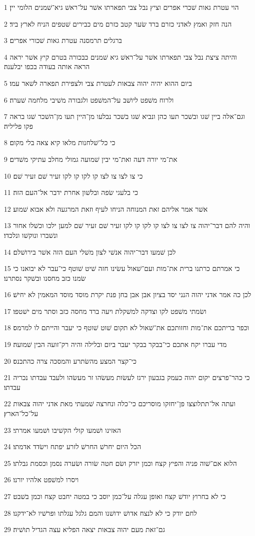 \par 1 הוי עטרת גאות שׁכרי אפרים וציץ נבל צבי תפארתו אשׁר על־ראשׁ גיא־שׁמנים הלומי יין׃
\par 2 הנה חזק ואמץ לאדני כזרם ברד שׂער קטב כזרם מים כבירים שׁטפים הניח לארץ ביד׃
\par 3 ברגלים תרמסנה עטרת גאות שׁכורי אפרים׃
\par 4 והיתה ציצת נבל צבי תפארתו אשׁר על־ראשׁ גיא שׁמנים כבכורה בטרם קיץ אשׁר יראה הראה אותה בעודה בכפו יבלענה׃
\par 5 ביום ההוא יהיה יהוה צבאות לעטרת צבי ולצפירת תפארה לשׁאר עמו׃
\par 6 ולרוח משׁפט ליושׁב על־המשׁפט ולגבורה משׁיבי מלחמה שׁערה׃
\par 7 וגם־אלה ביין שׁגו ובשׁכר תעו כהן ונביא שׁגו בשׁכר נבלעו מן־היין תעו מן־השׁכר שׁגו בראה פקו פליליה׃
\par 8 כי כל־שׁלחנות מלאו קיא צאה בלי מקום׃
\par 9 את־מי יורה דעה ואת־מי יבין שׁמועה גמולי מחלב עתיקי משׁדים׃
\par 10 כי צו לצו צו לצו קו לקו קו לקו זעיר שׁם זעיר שׁם׃
\par 11 כי בלעגי שׂפה ובלשׁון אחרת ידבר אל־העם הזה׃
\par 12 אשׁר אמר אליהם זאת המנוחה הניחו לעיף וזאת המרגעה ולא אבוא שׁמוע׃
\par 13 והיה להם דבר־יהוה צו לצו צו לצו קו לקו קו לקו זעיר שׁם זעיר שׁם למען ילכו וכשׁלו אחור ונשׁברו ונוקשׁו ונלכדו׃
\par 14 לכן שׁמעו דבר־יהוה אנשׁי לצון משׁלי העם הזה אשׁר בירושׁלם׃
\par 15 כי אמרתם כרתנו ברית את־מות ועם־שׁאול עשׂינו חזה שׁיט שׁוטף כי־עבר לא יבואנו כי שׂמנו כזב מחסנו ובשׁקר נסתרנו׃
\par 16 לכן כה אמר אדני יהוה הנני יסד בציון אבן אבן בחן פנת יקרת מוסד מוסד המאמין לא יחישׁ׃
\par 17 ושׂמתי משׁפט לקו וצדקה למשׁקלת ויעה ברד מחסה כזב וסתר מים ישׁטפו׃
\par 18 וכפר בריתכם את־מות וחזותכם את־שׁאול לא תקום שׁוט שׁוטף כי יעבר והייתם לו למרמס׃
\par 19 מדי עברו יקח אתכם כי־בבקר בבקר יעבר ביום ובלילה והיה רק־זועה הבין שׁמועה׃
\par 20 כי־קצר המצע מהשׂתרע והמסכה צרה כהתכנס׃
\par 21 כי כהר־פרצים יקום יהוה כעמק בגבעון ירגז לעשׂות מעשׂהו זר מעשׂהו ולעבד עבדתו נכריה עבדתו׃
\par 22 ועתה אל־תתלוצצו פן־יחזקו מוסריכם כי־כלה ונחרצה שׁמעתי מאת אדני יהוה צבאות על־כל־הארץ׃
\par 23 האזינו ושׁמעו קולי הקשׁיבו ושׁמעו אמרתי׃
\par 24 הכל היום יחרשׁ החרשׁ לזרע יפתח וישׂדד אדמתו׃
\par 25 הלוא אם־שׁוה פניה והפיץ קצח וכמן יזרק ושׂם חטה שׂורה ושׂערה נסמן וכסמת גבלתו׃
\par 26 ויסרו למשׁפט אלהיו יורנו׃
\par 27 כי לא בחרוץ יודשׁ קצח ואופן עגלה על־כמן יוסב כי במטה יחבט קצח וכמן בשׁבט׃
\par 28 לחם יודק כי לא לנצח אדושׁ ידושׁנו והמם גלגל עגלתו ופרשׁיו לא־ידקנו׃
\par 29 גם־זאת מעם יהוה צבאות יצאה הפליא עצה הגדיל תושׁיה׃

